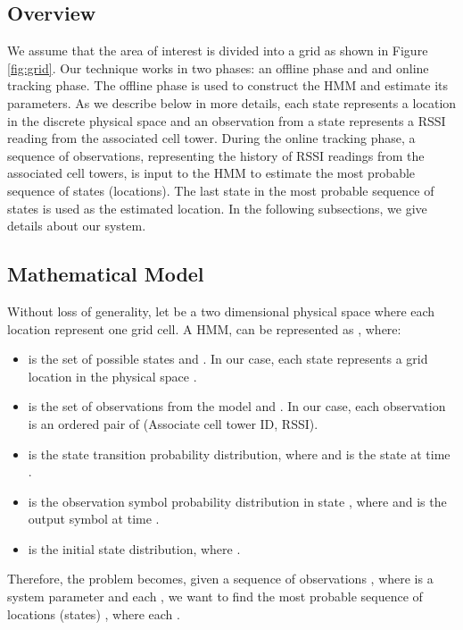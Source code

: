 \documentclass[conference]{IEEEtran}
\begin{document}
\subsection{Overview}
We assume that the area of interest is divided into a grid as shown
in Figure \ref{fig:grid}. Our technique works in two phases: an
offline phase and and online tracking phase. The offline phase is
used to construct the HMM and estimate its parameters. As we
describe below in more details, each state represents a location in
the discrete physical space and an observation from a state
represents a RSSI reading from the associated cell tower. During the
online tracking phase, a sequence of observations, representing the
history of RSSI readings from the associated cell towers, is input
to the HMM to estimate the
 most probable sequence of states (locations). The last state in the most probable
sequence of states is used as the estimated location. In the following subsections, we give details about our system.

\subsection{Mathematical Model}
Without loss of generality, let  be a two dimensional
physical space where each location represent one grid cell. A HMM,
 can be represented as 
\cite{}, where:

\begin{itemize}
\item  is the set of possible states and .
In our case, each state represents a grid location in the physical
space .

\item  is the set of observations from the
model  and . In our case, each observation is an ordered
pair of (Associate cell tower ID, RSSI).

\item  is the state transition probability
distribution, where 
and  is the state at time .

\item  is the observation symbol probability
distribution in state , where  and  is the output symbol at time
.

\item  is the initial state distribution, where .
\end{itemize}

 Therefore, the problem becomes, given a sequence of observations , where  is a system parameter and each , we want to
find the most probable sequence of locations (states) , where each .
\end{document}
